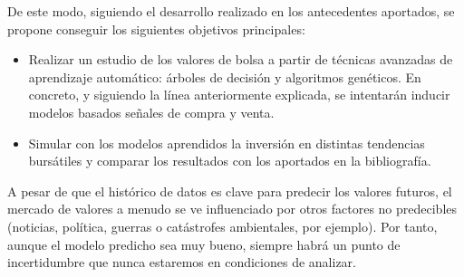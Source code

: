 	De este modo, siguiendo el desarrollo realizado en los antecedentes aportados, se propone conseguir los siguientes objetivos principales:
	
	\begin{itemize}
	    \item Realizar un estudio de los valores de bolsa a partir de t\'ecnicas avanzadas de aprendizaje autom\'atico: \'arboles de decisi\'on y algoritmos gen\'eticos. En concreto, y siguiendo la l\'inea anteriormente explicada, se intentar\'an inducir modelos basados se\~nales de compra y venta.
	    \item Simular con los modelos aprendidos la inversi\'on en distintas tendencias burs\'atiles y comparar los resultados con los aportados en la bibliograf\'ia.
	\end{itemize}
	
	A pesar de que el hist\'orico de datos es clave para predecir los valores futuros, el mercado de valores a menudo se ve influenciado por otros factores no predecibles (noticias, pol\'itica, guerras o cat\'astrofes ambientales, por ejemplo). Por tanto, aunque el modelo predicho sea muy bueno, siempre habr\'a un punto de incertidumbre que nunca estaremos en condiciones de analizar.\\
	
	
	